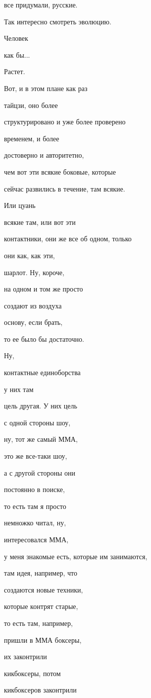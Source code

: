 все придумали, русские.

Так интересно смотреть эволюцию.

Человек

как бы...

Растет.

Вот, и в этом плане как раз

тайцзи, оно более

структурировано и уже более проверено

временем, и более

достоверно и авторитетно,

чем вот эти всякие боковые, которые

сейчас развились в течение, там всякие.

Или цуань

всякие там, или вот эти

контактники, они же все об одном, только

они как, как эти,

шарлот. Ну, короче,

на одном и том же просто

создают из воздуха

основу, если брать,

то ее было бы достаточно.

Ну,

контактные единоборства

у них там

цель другая. У них цель

с одной стороны шоу,

ну, тот же самый ММА,

это же все-таки шоу,

а с другой стороны они

постоянно в поиске,

то есть там я просто

немножко читал, ну,

интересовался ММА,

у меня знакомые есть, которые им занимаются,

там идея, например, что

создаются новые техники,

которые контрят старые,

то есть там, например,

пришли в ММА боксеры,

их законтрили

кикбоксеры, потом

кикбоксеров законтрили

